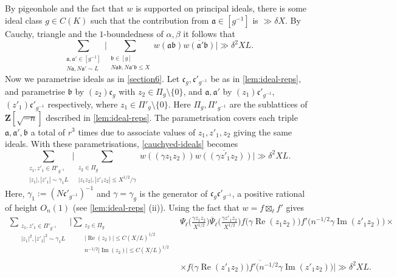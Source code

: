 \documentclass[11pt,reqno]{amsart}
\numberwithin{equation}{section}
\theoremstyle{definition}
\theoremstyle{remark}
\newcommand{\mf}{\mathfrak}
\newcommand{\on}{\operatorname}
\renewcommand{\le}{\leqslant}
\renewcommand{\Re}{\on{Re}}
\renewcommand{\Im}{\on{Im}}
\newcommand\Z{\mathbf{Z}}
\begin{document}
By pigeonhole and the fact that $w$ is supported on principal ideals, there is some ideal class $g \in C(K)$ such that the contribution from $\mf{a} \in [g^{-1}]$ is $\gg \delta X$. By Cauchy, triangle and the $1$-boundedness of $\alpha, \beta$ it follows that
\begin{equation}\label{cauchyed-ideals} \sum_{\substack{\mf{a}, \mf{a}' \in [g^{-1}] \\ N\mf{a}, N\mf{a}' \sim  L}} \Big| \sum_{\substack{\mf{b}\in [g] \\ N\mf{a}\mf{b}, N\mf{a}'\mf{b} \le X}} w(\mf{a} \mf{b})\overline{w(\mf{a}' \mf{b})}\Big| \gg \delta^2 XL.\end{equation}
Now we parametrise ideals as in \cref{section6}. Let $\mf{c}_g,\mf{c}'_{g^{-1}}$ be as in \cref{lem:ideal-reps}, and parametrise $\mf{b}$ by $(z_2) \mf{c}_g$ with $z_2 \in \Pi_g \setminus \{0\}$, and $\mf{a}, \mf{a'}$ by $(z_1) \mf{c}'_{g^{-1}}$, $(z'_1) \mf{c}'_{g^{-1}}$ respectively, where $z_1 \in \Pi'_g \setminus \{0\}$. Here $\Pi_g, \Pi'_{g^{-1}}$ are the sublattices of $\Z[\sqrt{-n}]$ described in \cref{lem:ideal-reps}. The parametrisation covers each triple $\mf{a}, \mf{a'}, \mf{b}$ a total of $r^3$ times due to associate values of $z_1, z'_1, z_2$ giving the same ideals. With these parametrisations, \cref{cauchyed-ideals} becomes 
\[ \sum_{\substack{z_1, z'_1 \in \Pi'_{g^{-1}} \\ |z_1|, |z'_1| \sim \gamma_1 L}}  \Big|  \sum_{\substack{z_2 \in \Pi_g \\ |z_1 z_2|, |z'_1 z_2| \le X^{1/2}/\gamma}}  w((\gamma z_1 z_2 ))\overline{w((\gamma z'_1 z_2 ))} \Big| \gg \delta^{2} XL.\]
Here, $\gamma_1 := (N\mf{c}'_{g^{-1}})^{-1}$ and $\gamma = \gamma_g$ is the generator of $\mf{c}_g \mf{c}'_{g^{-1}}$, a positive rational of height $O_n(1)$ (see \cref{lem:ideal-reps} (ii)). Using the fact that $w = f \boxtimes_{\ell} f'$ gives
\begin{align*} \sum_{\substack{z_1, z'_1 \in \Pi'_{g^{-1}} \\ |z_1|^2, |z'_1|^2\sim \gamma_1 L}}  \Big|  \sum_{\substack{z_2 \in \Pi_g \\ |\Re(z_2)| \le  C(X/L)^{1/2} \\  n^{-1/2}|\Im(z_2)| \le C(X/L)^{1/2}}} & \Psi_{\ell} \Big(\frac{\gamma z_1 z_2}{X^{1/2}}\Big)\overline{\Psi}_{\ell} \Big(\frac{\gamma z'_1 z_2}{X^{1/2}}\Big) f\big(\gamma \Re (z_1 z_2)\big) f'\big( n^{-1/2}\gamma  \Im ( z'_1 z_2)\big) \times \\ & \times \overline{f\big(\gamma \Re (z'_1 z_2)\big) f'\big( n^{-1/2}\gamma  \Im ( z'_1 z_2)\big)} \Big| \gg \delta^{2} XL.\end{align*}
\end{document}
